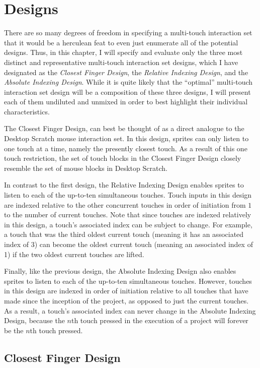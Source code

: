 \chapter{Designs}

There are so many degrees of freedom in specifying a multi-touch interaction set that it would be a herculean feat to even just enumerate all of the potential designs. Thus, in this chapter, I will specify and evaluate only the three most distinct and representative multi-touch interaction set designs, which I have designated as the \emph{Closest Finger Design},  the \emph{Relative Indexing Design}, and the \emph{Absolute Indexing Design}. While it is quite likely that the ``optimal'' multi-touch interaction set design will  be a composition of these three designs, I will present each of them undiluted and unmixed in order to best highlight their individual characteristics.

The Closest Finger Design, can best be thought of as a direct analogue to the Desktop Scratch mouse interaction set. In this design, sprites can only listen to one touch at a time, namely the presently closest touch. As a result of this one touch restriction, the set of touch blocks in the Closest Finger Design closely resemble the set of mouse blocks in Desktop Scratch.

In contrast to the first design, the Relative Indexing Design enables sprites to listen to each of the up-to-ten simultaneous touches. Touch inputs in this design are indexed relative to the other concurrent touches in order of initiation from $1$ to the number of current touches. Note that since touches are indexed relatively in this design, a touch's associated index can  be subject to change. For example, a touch that was the third oldest current touch (meaning it has an associated index of 3) can become the oldest current touch (meaning an associated index of 1) if the two oldest current touches are lifted.

Finally, like the previous design, the  Absolute Indexing Design also enables sprites to listen to each of the up-to-ten simultaneous touches. However, touches in this design are indexed in order of initiation relative to all touches that have made since the inception of the project, as opposed to just the current touches. As a result, a touch's associated index can never change in the Absolute Indexing Design, because the $n$th touch pressed in the execution of a project will forever be the $n$th touch pressed.


\section{Closest Finger Design}

